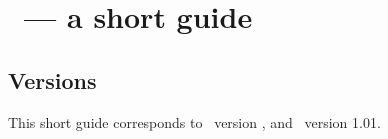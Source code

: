 \documentclass[11pt]{scrartcl}
\newcommand{\SUBSECTION}[1]{\subsection*{#1}}
\begin{document}
\section*{\CosmoPMC\ --- a short guide}

\SUBSECTION{Versions}

This short guide corresponds to \CosmoPMC\ version \CosmoPMCVersion,
and \pmclib\ version 1.01.




\end{document}
